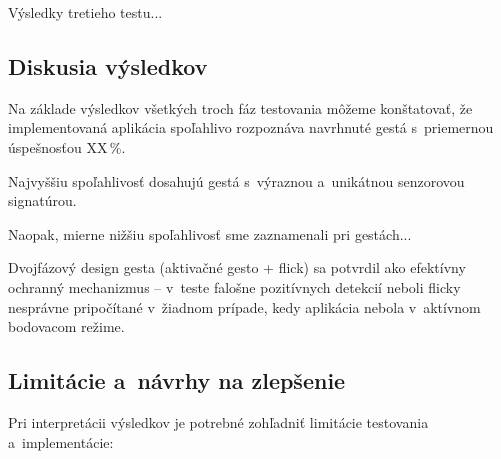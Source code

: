 
Výsledky tretieho testu... %

\subsection{Diskusia výsledkov}


Na základe výsledkov všetkých troch fáz testovania
môžeme konštatovať, že implementovaná aplikácia
spoľahlivo rozpoznáva navrhnuté gestá s~priemernou
úspešnosťou XX\,\%. %

Najvyššiu spoľahlivosť dosahujú gestá s~výraznou
a~unikátnou senzorovou signatúrou. %

Naopak, mierne nižšiu spoľahlivosť sme zaznamenali
pri gestách... %

Dvojfázový design gesta  (aktivačné
gesto + flick) sa potvrdil ako efektívny ochranný
mechanizmus -- v~teste falošne pozitívnych detekcií
neboli flicky nesprávne pripočítané v~žiadnom
prípade, kedy aplikácia nebola v~aktívnom bodovacom
režime. %

\subsection{Limitácie a~návrhy na zlepšenie}

Pri interpretácii výsledkov je potrebné zohľadniť
limitácie testovania a~implementácie:

